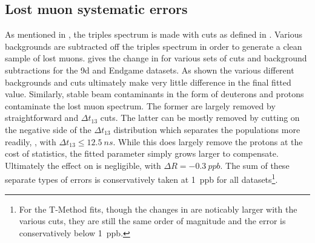 \subsection{Lost muon systematic errors}
\label{sub:lostmuonserror}


As mentioned in , the triples spectrum is made with cuts as defined in . Various backgrounds are subtracted off the triples spectrum in order to generate a clean sample of lost muons.  gives the change in \R for various sets of cuts and background subtractions for the 9d and Endgame datasets. As shown the various different backgrounds and cuts ultimately make very little difference in the final fitted \R value. Similarly, stable beam contaminants in the form of deuterons and protons contaminate the lost muon spectrum. The former are largely removed by straightforward \DT and $\Delta t_{13}$ cuts. The latter can be mostly removed by cutting on the negative side of the $\Delta t_{13}$ distribution which separates the populations more readily, , with $\Delta t_{13} \leq \SI{12.5}{ns}$. While this does largely remove the protons at the cost of statistics, the fitted \K parameter simply grows larger to compensate. Ultimately the effect on \R is negligible, with $\Delta R = \SI{-0.3}{ppb}$. The sum of these separate types of errors is conservatively taken at \SI{1}{ppb} for all datasets\footnote{For the T-Method fits, though the changes in \R are noticably larger with the various cuts, they are still the same order of magnitude and the error is conservatively below \SI{1}{ppb}.}.


